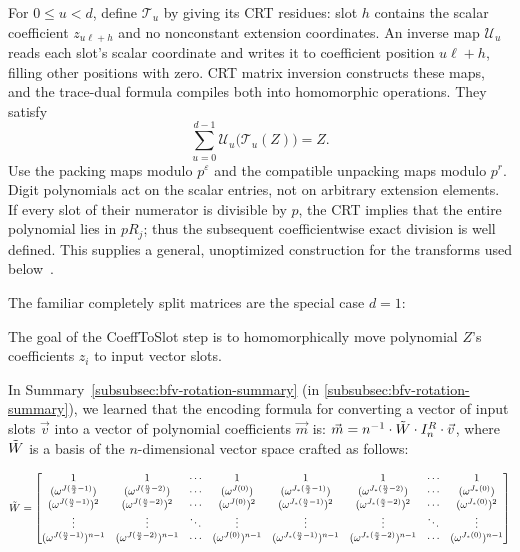 For $0\leq u<d$, define $\mathcal T_u$ by giving its CRT residues: slot $h$ contains the scalar coefficient $z_{u\ell+h}$ and no nonconstant extension coordinates. An inverse map $\mathcal U_u$ reads each slot's scalar coordinate and writes it to coefficient position $u\ell+h$, filling other positions with zero. CRT matrix inversion constructs these maps, and the trace-dual formula compiles both into homomorphic operations. They satisfy
\[
\sum_{u=0}^{d-1}\mathcal U_u\bigl(\mathcal T_u(Z)\bigr)=Z.
\]
Use the packing maps modulo $p^\varepsilon$ and the compatible unpacking maps modulo $p^r$. Digit polynomials act on the scalar entries, not on arbitrary extension elements. If every slot of their numerator is divisible by $p$, the CRT implies that the entire polynomial lies in $pR_j$; thus the subsequent coefficientwise exact division is well defined. This supplies a general, unoptimized construction for the transforms used below~\cite{cryptoeprint:2022/1363}.

The familiar completely split matrices are the special case $d=1$:

The goal of the \textsf{CoeffToSlot} step is to homomorphically move polynomial $Z$'s coefficients $z_i$ to input vector slots. 


In Summary~\ref*{subsubsec:bfv-rotation-summary} (in \autoref{subsubsec:bfv-rotation-summary}), we learned that the encoding formula for converting a vector of input slots $\vec{v}$ into a vector of polynomial coefficients $\vec{m}$ is: $\vec{m} = n^{-1}\cdot\tilde{W} \cdot I_n^R \cdot \vec{v}$, where $\tilde{W}$ is a basis of the $n$-dimensional vector space crafted as follows: 

$\tilde{W} = \begin{bmatrix}
1 & 1 & \cdots & 1 & 1 & 1 & \cdots & 1\\
(\omega^{J(\frac{n}{2} - 1)}) & (\omega^{J(\frac{n}{2} - 2)}) & \cdots & (\omega^{J(0)}) & (\omega^{J_*(\frac{n}{2} - 1)}) & (\omega^{J_*(\frac{n}{2} - 2)}) & \cdots & (\omega^{J_*(0)})\\
(\omega^{J(\frac{n}{2} - 1)})^2 & (\omega^{J(\frac{n}{2} - 2)})^2 & \cdots & (\omega^{J(0)})^2 & (\omega^{J_*(\frac{n}{2} - 1)})^2 & (\omega^{J_*(\frac{n}{2} - 2)})^2 & \cdots & (\omega^{J_*(0)})^2 \\
\vdots & \vdots & \ddots & \vdots & \vdots & \vdots & \ddots & \vdots \\
(\omega^{J(\frac{n}{2} - 1)})^{n-1} & (\omega^{J(\frac{n}{2} - 2)})^{n-1} & \cdots & (\omega^{J(0)})^{n-1} & (\omega^{J_*(\frac{n}{2} - 1)})^{n-1} & (\omega^{J_*(\frac{n}{2} - 2)})^{n-1} & \cdots  & (\omega^{J_*(0)})^{n-1}
\end{bmatrix}$

